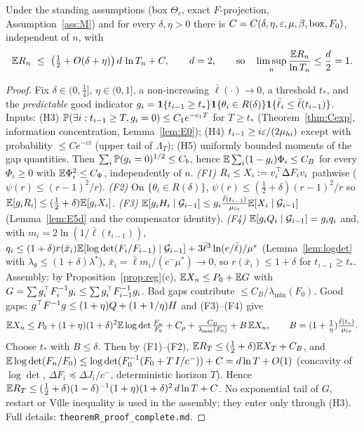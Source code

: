 \begin{theorem}[expected regret, sharp constant, $K=1$, $k_0>1$]\label{thm:R}\Ps{}
Under the standing assumptions (box $\Theta_c$, exact $F$-projection, Assumption~\ref{ass:M}) and for every $\delta,\eta>0$ there is $C=C(\delta,\eta,\eps,\mu,\beta,\text{box},F_0)$, independent of $n$, with
\[
\E R_n\ \le\ \big(\tfrac12+O(\delta+\eta)\big)\,d\,\ln T_n+C,\qquad d=2,\qquad\text{so}\quad \limsup_n\frac{\E R_n}{\ln T_n}\le\frac d2=1 .
\]
\end{theorem}
\begin{proof}
Fix $\delta\in(0,\frac14]$, $\eta\in(0,1]$, a non-increasing $\bar\ell(\cdot)\to0$, a threshold $t_*$, and the \emph{predictable} good indicator $g_i=\1\{t_{i-1}\ge t_*\}\1\{\theta_i\in R(\delta)\}\1\{\bar\ell_i\le\bar\ell(t_{i-1})\}$. Inputs: (H3) $\P(\exists i:t_{i-1}\ge T,g_i=0)\le C_1e^{-c_1T}$ for $T\ge t_*$ (Theorem~\ref{thm:Cexp}, information concentration, Lemma~\ref{lem:E0}); (H4) $t_{i-1}\ge i\eps/(2\mu_{hi})$ except with probability $\le Ce^{-ci}$ (upper tail of $\Lambda_T$); (H5) uniformly bounded moments of the gap quantities. Then $\sum_i\P(g_i=0)^{1/2}\le C_b$, hence $\E\sum_i(1-g_i)\Phi_i\le C_B$ for every $\Phi_i\ge0$ with $\E\Phi_i^2\le C_\Phi$, independently of $n$.
\emph{(F1)} $R_i\le X_i:=v_i\T\Delta F_iv_i$ pathwise ($\psi(r)\le(r-1)^2/r$). \emph{(F2)} On $\{\theta_i\in R(\delta)\}$, $\psi(r)\le(\frac12+\delta)(r-1)^2/r$ so $\E[g_iR_i]\le(\frac12+\delta)\E[g_iX_i]$. \emph{(F3)} $\E[g_iH_i\mid\cG_{i-1}]\le g_i\frac{\bar\ell(t_{i-1})}{\mu_{lo}}\E[X_i\mid\cG_{i-1}]$ (Lemma~\ref{lem:E5d} and the compensator identity). \emph{(F4)} $\E[g_iQ_i\mid\cG_{i-1}]=g_iq_i$ and, with $m_i=2\ln(1/\bar\ell(t_{i-1}))$, $q_i\le(1+\delta)r(\bar x_i)\E[\log\det(F_i/F_{i-1})\mid\cG_{i-1}]+3\bar\ell^3\ln(e/\bar\ell)/\mu^*$ (Lemma~\ref{lem:logdet} with $\lambda_\theta\le(1+\delta)\lambda^*$), $\bar x_i=\bar\ell m_i/(c^-\mu^*)\to0$, so $r(\bar x_i)\le1+\delta$ for $t_{i-1}\ge t_*$.
Assembly: by Proposition~\ref{prop:reg}(c), $\E X_n\le P_0+\E G$ with $G=\sum g_i\T F_i^{-1}g_i\le\sum g_i\T F_{i-1}^{-1}g_i$. Bad gaps contribute $\le C_B/\lambda_{\min}(F_0)$. Good gaps: $g\T F^{-1}g\le(1+\eta)Q+(1+1/\eta)H$ and (F3)--(F4) give
\[
\E X_n\le P_0+(1+\eta)(1+\delta)^2\E\log\det\tfrac{F_n}{F_0}+C_\rho+\tfrac{C_B}{\lambda_{\min}(F_0)}+B\,\E X_n,\qquad B=(1+\tfrac1\eta)\tfrac{\bar\ell(t_*)}{\mu_{lo}} .
\]
Choose $t_*$ with $B\le\delta$. Then by (F1)--(F2), $\E R_T\le(\frac12+\delta)\E X_T+C_B$, and $\E\log\det(F_n/F_0)\le\log\det(F_0^{-1}(F_0+T\,I/c^-))+C=d\ln T+O(1)$ (concavity of $\log\det$, $\Delta F_i\preceq\Delta J_i/c^-$, deterministic horizon $T$). Hence $\E R_T\le(\frac12+\delta)(1-\delta)^{-1}(1+\eta)(1+\delta)^2\,d\ln T+C$. No exponential tail of $G$, restart or Ville inequality is used in the assembly; they enter only through (H3). Full details: \texttt{theoremR\_proof\_complete.md}.
\end{proof}
